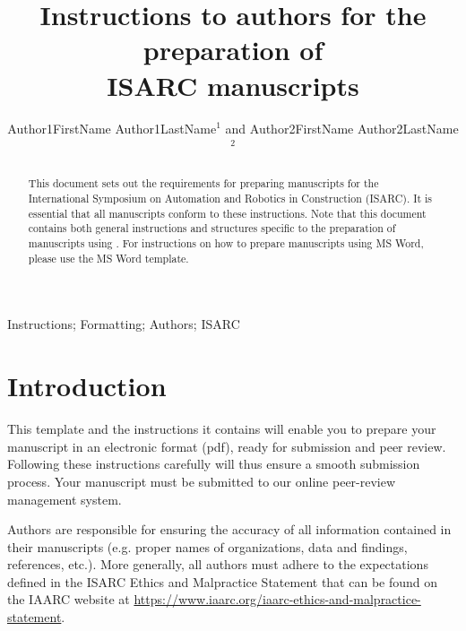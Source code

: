 \documentclass[a4paper, times, 10pt, twocolumn, twoside]{article}
\begin{document}
\linespread{0.5}

\title{Instructions to authors for the preparation of \\ISARC manuscripts}

\author{Author1FirstName Author1LastName$^{1}$ and Author2FirstName Author2LastName$^2$}




\maketitle 
\thispagestyle{fancy} 
\pagestyle{fancy}



\begin{abstract}
This document sets out the requirements for preparing manuscripts for the International Symposium on Automation and Robotics in Construction (ISARC). 
It is essential that all manuscripts conform to these instructions. 
Note that this document contains both general instructions and structures specific to the preparation of manuscripts using .
For instructions on how to prepare manuscripts using MS Word, please use the MS Word template.
\end{abstract}

\begin{keywords}
Instructions; Formatting; Authors; ISARC
\end{keywords}


\section{Introduction}
\label{sec:Introduction}

This  template and the instructions it contains will enable you to prepare your manuscript in an electronic format (pdf), ready for submission and peer review. 
Following these instructions carefully will thus ensure a smooth submission process.
Your manuscript must be submitted to our online peer-review management system.



Authors are responsible for ensuring the accuracy of all information contained in their manuscripts (e.g. proper names of organizations, data and findings, references, etc.).
More generally, all authors must adhere to the expectations defined in the ISARC Ethics and Malpractice Statement that can be found on the IAARC website at \url{https://www.iaarc.org/iaarc-ethics-and-malpractice-statement}.
\end{document}
